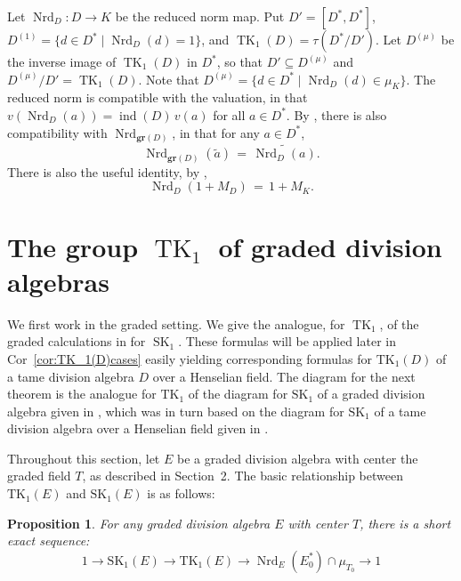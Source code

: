 \documentclass[11pt]{article}
\numberwithin{equation}{section}
\theoremstyle{plain}
\newtheorem{proposition}[theorem]{Proposition}
\theoremstyle{remark}
\newcommand{\gr}{\mathbf{gr}}
\newcommand{\opn}{\operatorname}
\newcommand{\SK}{\opn{SK_1}}
\newcommand{\TK}{\opn{TK_1}}
\newcommand{\Dmu}{D^{(\mu)}}
\newcommand{\Nrd}{\opn{Nrd}}
\newcommand{\wt}{\widetilde}
\begin{document}
 Let $\Nrd_D\colon D \to K$ be the reduced norm map.
 Put $D'=[D^*,D^*]$, ${D^{(1)}=\{d\in D^*\mid \Nrd_D(d)=1\}}$, and $\operatorname{TK}_1(D)=\tau(D^*/D')$. 
 Let $\Dmu$ be the inverse image of $\operatorname{TK}_1(D)$ in $D^*$, 
 so that $D'\subseteq \Dmu$ and $\Dmu/D'=\operatorname{TK}_1(D)$. Note that 
$\Dmu = \{d\in D^*\mid \operatorname{Nrd}_D(d)\in \mu_K\}$.  The reduced norm is compatible with the 
valuation, in that $v(\Nrd_D(a)) = \opn{ind}(D)\,v(a)$ for all $a\in D^*$.  By \cite[Cor.~4.4]{hazrat-wadsworth-2011}, there 
is also compatibility with $\Nrd_{\gr(D)}$, in that for any $a\in D^*$,
\begin{equation}
\label{eq:Nrdcompatibility}
\Nrd_{\gr(D)}(\wt a) \, = \, \wt{\Nrd_D(a)}.
\end{equation}  
There is also the useful identity, by \cite[Cor.~4.7]{hazrat-wadsworth-2011},
\begin{equation}
\label{eq:Nrd(1+M_D)}
\Nrd_D(1+M_D) \, = \, 1+M_K.
\end{equation}

\section{The group $\operatorname{TK}_1$ of graded division algebras}\label{sec:graded-tk1}

We first work in the graded setting.  We give the analogue, for $\operatorname{TK}_1$, of the graded calculations 
in \cite{hazrat-wadsworth-2011} for $\operatorname{SK}_1$.  These formulas will be applied later in  
Cor~\ref{cor:TK_1(D)cases} easily yielding corresponding formulas for $\TK(D)$
of a tame division algebra $D$ over a Henselian field.  The diagram for the next theorem is the analogue for 
$\TK$ of the diagram for $\SK$ of a graded division algebra given in \cite[Th.~3.4]{hazrat-wadsworth-2011}, which was in 
turn based on the diagram for $\SK$ of a tame division algebra over a Henselian field given in \cite{ershov-1982}.

Throughout this section, let $E$ be a graded division algebra with center the graded field $T$,
 as described in Section~2.  The basic relationship  
between $\TK(E)$ and $\SK(E)$ is as follows:

\begin{proposition}
\label{prop:TKvsSKforE}
For any graded division algebra $E$ with center $T$, there is a short exact sequence:
\begin{equation}
\label{SESforTK(E)}
1 \longrightarrow  \SK(E) \longrightarrow \TK(E) \longrightarrow \Nrd_{E}(E_0^*)\cap \mu_{T_0} \longrightarrow 1
\end{equation}
\end{proposition}
\end{document}
